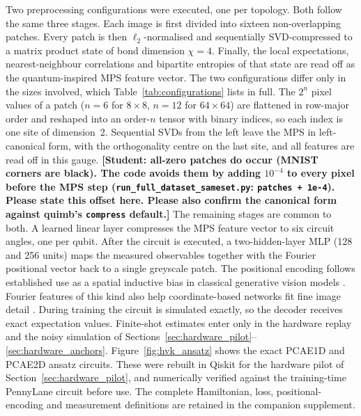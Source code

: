 \documentclass[pdflatex,sn-basic]{sn-jnl}
\begin{document}
Two preprocessing configurations were executed, one per topology. Both follow the
same three stages. Each image is first divided into sixteen non-overlapping
patches. Every patch is then $\ell_2$-normalised and sequentially SVD-compressed
to a matrix product state of bond dimension $\chi=4$. Finally, the local
expectations, nearest-neighbour correlations and bipartite entropies of that
state are read off as the quantum-inspired MPS feature vector. The two configurations
differ only in the sizes involved, which Table~\ref{tab:configurations} lists in
full.
The $2^{n}$ pixel values of a patch ($n=6$ for $8\times8$, $n=12$ for
$64\times64$) are flattened in row-major order and reshaped into an
order-$n$ tensor with binary indices, so each index is one site of dimension~2.
Sequential SVDs from the left leave the MPS in left-canonical form, with the
orthogonality centre on the last site, and all features are read off in this
gauge.
{\color{red}\textbf{[Student: all-zero patches do occur (MNIST corners are
black). The code avoids them by adding $10^{-4}$ to every pixel before the MPS
step (\texttt{run\_full\_dataset\_sameset.py}: \texttt{patches + 1e-4}). Please
state this offset here. Please also confirm the canonical form against
quimb's \texttt{compress} default.]}}
The remaining stages are common to both. A learned linear layer compresses the MPS feature vector to six circuit angles, one per qubit. After the circuit is executed, a two-hidden-layer MLP (128 and 256 units) maps the measured observables together with the Fourier positional vector back to a single greyscale patch. The positional encoding follows established use as a spatial inductive bias in classical generative vision models \citep{Xu2021}. Fourier features of
this kind also help coordinate-based networks fit fine image detail
\citep{Tancik2020}. During training the circuit is simulated exactly, so the
decoder receives exact expectation values. Finite-shot estimates enter only in
the hardware replay and the noisy simulation of
Sections~\ref{sec:hardware_pilot}--\ref{sec:hardware_anchors}.
Figure~\ref{fig:hvk_ansatz} shows the exact PCAE1D and PCAE2D ansatz circuits. These were rebuilt in Qiskit for the hardware pilot of
Section~\ref{sec:hardware_pilot}, and numerically verified against the training-time PennyLane circuit before use. The complete Hamiltonian, loss,
positional-encoding and measurement definitions are retained in the companion supplement.
\end{document}
